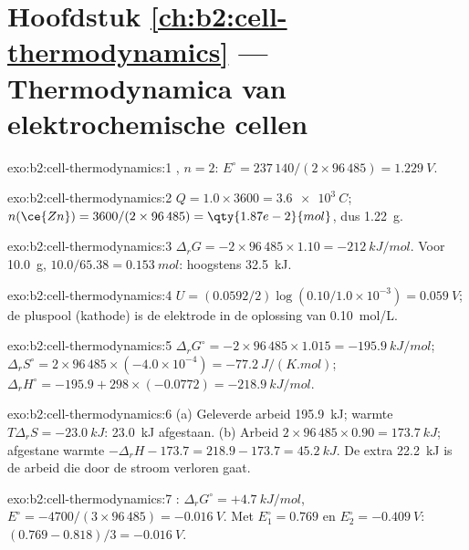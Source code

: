 \section*{Hoofdstuk \ref{ch:b2:cell-thermodynamics} --- Thermodynamica van elektrochemische cellen}

\begin{solution}{exo:b2:cell-thermodynamics:1}
, $n = 2$: $E^\circ = 237\,140/(2 \times 96\,485) =
\qty{1.229}{V}$.
\end{solution}

\begin{solution}{exo:b2:cell-thermodynamics:2}
$Q = 1.0 \times 3600 = \qty{3.6e3}{C}$; $n(\ce{Zn}) = 3600/(2 \times 96\,485) =
\qty{1.87e-2}{mol}$, dus \qty{1.22}{g}.
\end{solution}

\begin{solution}{exo:b2:cell-thermodynamics:3}
$\Delta_r G = -2 \times 96\,485 \times 1.10 = \qty{-212}{kJ/mol}$. Voor
\qty{10.0}{g}, $10.0/65.38 = \qty{0.153}{mol}$: hoogstens \qty{32.5}{kJ}.
\end{solution}

\begin{solution}{exo:b2:cell-thermodynamics:4}
$U = (0.0592/2)\log(0.10/1.0 \times 10^{-3}) = \qty{0.059}{V}$; de pluspool
(kathode) is de elektrode in de oplossing van \qty{0.10}{mol/L}.
\end{solution}

\begin{solution}{exo:b2:cell-thermodynamics:5}
$\Delta_r G^\circ = -2 \times 96\,485 \times 1.015 = \qty{-195.9}{kJ/mol}$;
$\Delta_r S^\circ = 2 \times 96\,485 \times (-4.0 \times 10^{-4}) =
\qty{-77.2}{J/(K.mol)}$; $\Delta_r H^\circ = -195.9 + 298 \times (-0.0772) =
\qty{-218.9}{kJ/mol}$.
\end{solution}

\begin{solution}{exo:b2:cell-thermodynamics:6}
(a) Geleverde arbeid \qty{195.9}{kJ}; warmte $T\Delta_r S = \qty{-23.0}{kJ}$: \qty{23.0}{kJ}
afgestaan. (b) Arbeid $2 \times 96\,485 \times 0.90 = \qty{173.7}{kJ}$; afgestane warmte
$-\Delta_r H - 173.7 = 218.9 - 173.7 = \qty{45.2}{kJ}$. De extra
\qty{22.2}{kJ} is de arbeid die door de stroom verloren gaat.
\end{solution}

\begin{solution}{exo:b2:cell-thermodynamics:7}
: $\Delta_r G^\circ = +\qty{4.7}{kJ/mol}$, $E^\circ =
-4700/(3 \times 96\,485) = \qty{-0.016}{V}$. Met $E_1^\circ = 0.769$ en
$E_2^\circ = \qty{-0.409}{V}$: $(0.769 - 0.818)/3 = \qty{-0.016}{V}$.
\end{solution}

